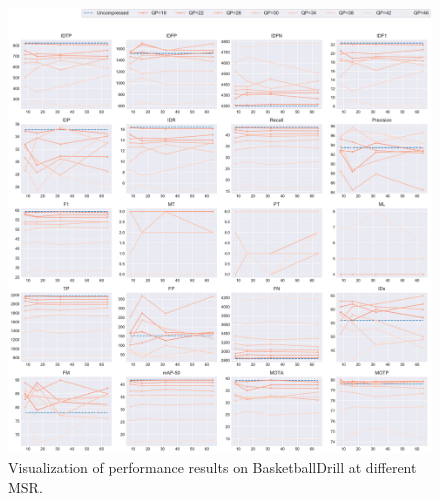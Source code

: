 \begin{figure}[!htbp]
\centering
\includegraphics[width=1.0\linewidth]{img/appendix/BasketballDrill_all_multiplots_msr.pdf}
\caption[Visualization of performance results on BasketballDrill at different MSR]
{Visualization of performance results on BasketballDrill at different MSR.}
\label{fig:BasketballDrill_all_msr}
\end{figure}




